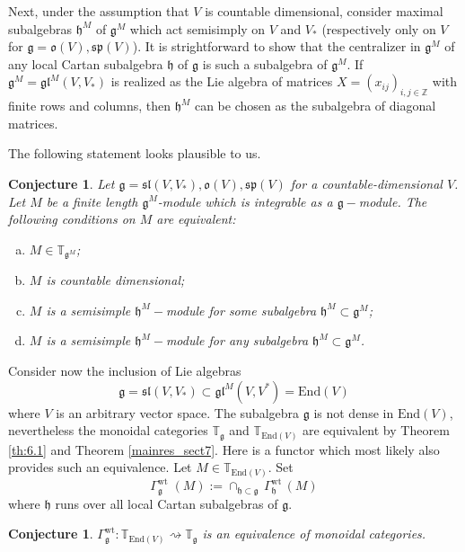 \documentclass[10pt]{amsart}
\newcounter{theorem}
\newtheorem{conjecture}[theo]{Conjecture}
\newcommand {\ZZ} {\mathbb {Z}}
\newcommand{\TT}{\mathbb{T}}
\newcommand{\wt}{\mathrm{wt}}
\renewcommand{\sp}{\mathfrak{sp}}
\renewcommand{\sl}{\mathfrak{sl}}
\newcommand{\oo}{\mathfrak{o}}
\newcommand{\hh}{\mathfrak{h}}
\renewcommand{\gg}{\mathfrak{g}}
\newcommand{\gl}{\mathfrak{gl}}
\newcommand{\End}{\mathrm{End}}
\begin{document}
\vspace{0.33cm}

Next, under the assumption that $V$ is countable dimensional, consider maximal subalgebras $\hh^M$ of $\gg^M$ which act semisimply on $V$ and $V_*$ (respectively only on $V$ for $\gg = \oo(V), \sp(V)$). 
It is strightforward to show that the centralizer in $\gg^M$ of any local Cartan subalgebra $\hh$ of $\gg$ is such a subalgebra of $\gg^M$. 
If $\gg^M = \gl^M(V,V_*)$ is realized as the Lie algebra of matrices $X = (x_{ij})_{i,j \in \ZZ}$ with finite rows and columns, then $\hh^M$ can 
be chosen as the subalgebra of diagonal matrices.

The following statement looks plausible to us.

\begin{conjecture}\label{conject:1}
Let $\gg = \sl(V,V_*), \oo(V), \sp(V)$ for a countable-dimensional $V$. Let $M$ be a finite length $\gg^M$-module which is integrable as a $\gg-$module. The following conditions on $M$ are equivalent:
\begin{enumerate}[a)]
 \item $M \in \TT_{\gg^M}$;
 \item $M$ is countable dimensional;
 \item $M$ is a semisimple $\hh^M-$module for some subalgebra $\hh^M\subset \gg^M$;
  \item $M$ is a semisimple $\hh^M-$module for any subalgebra $\hh^M \subset \gg^M$.
\end{enumerate}

\end{conjecture} 

\vspace{0.4cm}

Consider now the inclusion of Lie algebras 
$$\gg = \sl(V,V_*) \subset \gl^M(V,V^*) = \End(V)$$
where $V$ is an arbitrary vector space. The subalgebra $\gg$ is not dense in $\End(V)$, nevertheless the monoidal categories $\TT_{\gg}$ and $\TT_{\End(V)}$ are equivalent by Theorem \ref{th:6.1} and Theorem \ref{mainres_sect7}. Here is a functor which most likely also provides such an equivalence. Let $M \in \TT_{\End(V)}$. Set 
$$\Gamma_{\gg}^\wt \;(M) := \cap_{\hh \subset \gg}\,\Gamma_{\hh}^\wt\,(M)$$
where $\hh$ runs over all local Cartan subalgebras of $\gg$.

\begin{conjecture}
 $\Gamma_{\gg}^\wt: \TT_{\End(V)} \rightsquigarrow \TT_{\gg}$ is an equivalence of monoidal categories.
\end{conjecture}
\end{document}

